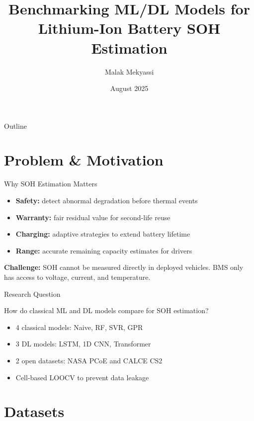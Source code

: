 \documentclass[aspectratio=169,11pt]{beamer}
\title{Benchmarking ML/DL Models for\\Lithium-Ion Battery SOH Estimation}
\author{Malak Mekyassi}
\institute{Capgemini Engineering}
\date{August 2025}
\begin{document}
\frame{\titlepage}

\begin{frame}{Outline}
\tableofcontents
\end{frame}

\section{Problem \& Motivation}

\begin{frame}{Why SOH Estimation Matters}
\begin{itemize}[nosep]
    \item \textbf{Safety:} detect abnormal degradation before thermal events
    \item \textbf{Warranty:} fair residual value for second-life reuse
    \item \textbf{Charging:} adaptive strategies to extend battery lifetime
    \item \textbf{Range:} accurate remaining capacity estimates for drivers
\end{itemize}
\vspace{0.5em}
\textbf{Challenge:} SOH cannot be measured directly in deployed vehicles. BMS only has access to voltage, current, and temperature.
\end{frame}

\begin{frame}{Research Question}
\begin{block}{How do classical ML and DL models compare for SOH estimation?}
\begin{itemize}[nosep]
    \item 4 classical models: Naive, RF, SVR, GPR
    \item 3 DL models: LSTM, 1D CNN, Transformer
    \item 2 open datasets: NASA PCoE and CALCE CS2
    \item Cell-based LOOCV to prevent data leakage
\end{itemize}
\end{block}
\end{frame}

\section{Datasets}
\end{document}
